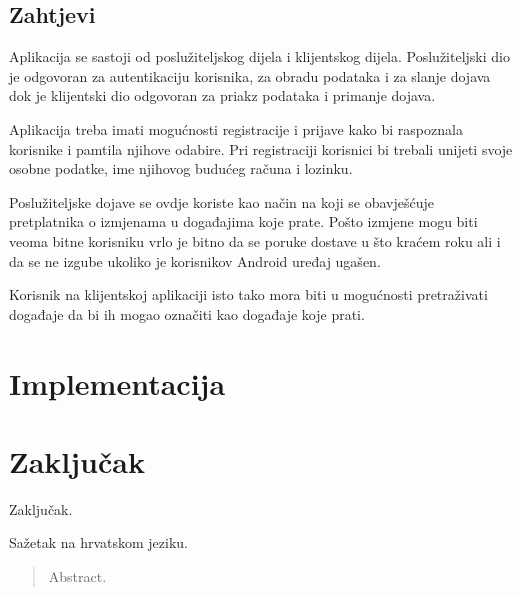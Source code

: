\documentclass[times, utf8, zavrsni]{fer}
\begin{document}
\section{Zahtjevi}

Aplikacija se sastoji od poslužiteljskog dijela i klijentskog dijela. Poslužiteljski dio je odgovoran za autentikaciju korisnika, za obradu podataka i za slanje dojava dok je klijentski dio odgovoran za priakz podataka i primanje dojava.

Aplikacija treba imati mogućnosti registracije i prijave kako bi raspoznala korisnike i pamtila njihove odabire. Pri registraciji korisnici bi trebali unijeti svoje osobne podatke, ime njihovog budućeg računa i lozinku.

Poslužiteljske dojave se ovdje koriste kao način na koji se obavješćuje pretplatnika o izmjenama u događajima koje prate. Pošto izmjene mogu biti veoma bitne korisniku vrlo je bitno da se poruke dostave u što kraćem roku ali i da se ne izgube ukoliko je korisnikov Android uređaj ugašen.

Korisnik na klijentskoj aplikaciji isto tako mora biti u mogućnosti pretraživati događaje da bi ih mogao označiti kao događaje koje prati.

\chapter{Implementacija}

\chapter{Zaključak}
Zaključak.




\begin{sazetak}
Sažetak na hrvatskom jeziku.

\end{sazetak}

\begin{abstract}
Abstract.

\end{abstract}
\end{document}
